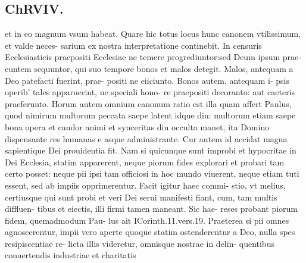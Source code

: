 \documentclass{article}
\begin{document}
\begin{pages}
\section*{ChRVIV. }
\marginpar{[ p.385 ]}\pstart et in eo magnum vsum habeat. Quare hic totus locus hunc canonem vtilissimum, et valde neces- sarium ex nostra interpretatione continebit. In censuris Ecclesiasticis praepositi Ecclesiae ne temere progrediuntor:sed Deum ipsum prae- euntem sequuntor, qui suo tempore bonos et malos detegit. Malos, antequam a Deo patefacti fuerint, prae- positi ne eiiciunto. Bonos autem, antequam i- psis operib' tales apparuerint, ne speciali hono- re praepositi decoranto: aut caeteris praeferunto. Horum autem omnium canonum ratio est illa quam affert Paulus, quod nimirum multorum peccata saepe latent idque diu: multorum etiam saepe bona opera et candor animi et synceritas diu occulta manet, ita Domino dispensante res humanas e asque administrante.  Cur autem id accidat magna sapientique Dei prouidentia fit. Nam si quicunque sunt improbi et hypocritae in Dei Ecclesia, statim apparerent, neque piorum fides explorari et probari tam certo posset: neque pii ipsi tam officiosi in hoc mundo viuerent, neque etiam tuti essent, sed ab impiis opprimerentur. Facit igitur haec commi- stio, vt melius, certiusque qui sunt probi et veri Dei serui manifesti fiant, cum, tam multis diffluen- tibus et eiectis, illi firmi tamen maneant. Sic hae- reses probant piorum fidem, quemadmodum Pau- lus ait ICorinth.11.vers.19. Praeterea si pii omnes agnoscerentur, impii vero aperte quoque statim ostenderentur a Deo, nulla spes resipiscentiae re- licta illis videretur, omnisque nostrae in delin- quentibus conuertendis industriae et charitatis  \pend

\end{pages}
\end{document}
